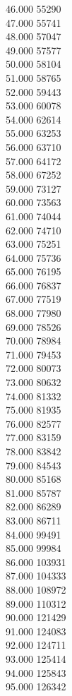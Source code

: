 { 46.000	55290 \\
 47.000	55741 \\
 48.000	57047 \\
 49.000	57577 \\
 50.000	58104 \\
 51.000	58765 \\
 52.000	59443 \\
 53.000	60078 \\
 54.000	62614 \\
 55.000	63253 \\
 56.000	63710 \\
 57.000	64172 \\
 58.000	67252 \\
 59.000	73127 \\
 60.000	73563 \\
 61.000	74044 \\
 62.000	74710 \\
 63.000	75251 \\
 64.000	75736 \\
 65.000	76195 \\
 66.000	76837 \\
 67.000	77519 \\
 68.000	77980 \\
 69.000	78526 \\
 70.000	78984 \\
 71.000	79453 \\
 72.000	80073 \\
 73.000	80632 \\
 74.000	81332 \\
 75.000	81935 \\
 76.000	82577 \\
 77.000	83159 \\
 78.000	83842 \\
 79.000	84543 \\
 80.000	85168 \\
 81.000	85787 \\
 82.000	86289 \\
 83.000	86711 \\
 84.000	99491 \\
 85.000	99984 \\
 86.000	103931 \\
 87.000	104333 \\
 88.000	108972 \\
 89.000	110312 \\
 90.000	121429 \\
 91.000	124083 \\
 92.000	124711 \\
 93.000	125414 \\
 94.000	125843 \\
 95.000	126342 \\
}
